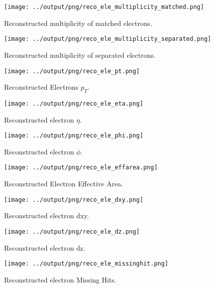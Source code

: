 \documentclass[11pt]{book}
\begin{document}
\begin{figure}[htb]
\centering
\texttt{[image: ../output/png/reco\_ele\_multiplicity\_matched.png]}
\caption{Reconstructed multiplicity of matched electrons.}
\label{fig:reco_ele_mat}
\end{figure}

\begin{figure}[htb]
\centering
\texttt{[image: ../output/png/reco\_ele\_multiplicity\_separated.png]}
\caption{Reconstructed multiplicity of separated electrons.}
\label{fig:reco_ele_sep}
\end{figure}

\begin{figure}[htb]
\centering
\texttt{[image: ../output/png/reco\_ele\_pt.png]}
\caption{Reconstructed Electrons $p_{T}$.}
\label{fig:reco_ele_pt}
\end{figure}

\begin{figure}[htb]
\centering
\texttt{[image: ../output/png/reco\_ele\_eta.png]}
\caption{Reconstructed electron $\eta$.}
\label{fig:reco_ele_eta}
\end{figure}

\begin{figure}[htb]
\centering
\texttt{[image: ../output/png/reco\_ele\_phi.png]}
\caption{Reconstructed electron $\phi$.}
\label{fig:reco_ele_phi}
\end{figure}

\begin{figure}[htb]
\centering
\texttt{[image: ../output/png/reco\_ele\_effarea.png]}
\caption{Reconstructed Electron Effective Area.}
\label{fig:reco_ele_effarea}
\end{figure}

\begin{figure}[htb]
\centering
\texttt{[image: ../output/png/reco\_ele\_dxy.png]}
\caption{Reconstructed electron dxy.}
\label{fig:reco_ele_dxy}
\end{figure}

\begin{figure}[htb]
\centering
\texttt{[image: ../output/png/reco\_ele\_dz.png]}
\caption{Reconstructed electron dz.}
\label{fig:reco_ele_dz}
\end{figure}

\begin{figure}[htb]
\centering
\texttt{[image: ../output/png/reco\_ele\_missinghit.png]}
\caption{Reconstructed electron Missing Hits.}
\label{fig:reco_ele_missinghit}
\end{figure}
\clearpage
\end{document}
